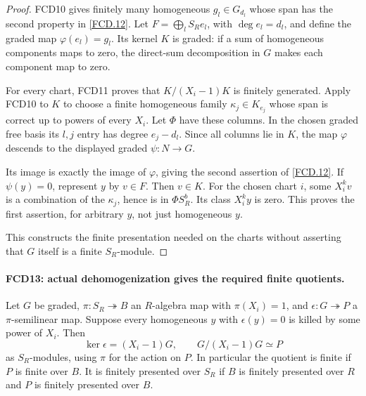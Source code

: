 \documentclass[11pt,a4paper]{article}
\numberwithin{equation}{section}
\theoremstyle{remark}\newtheorem{remark}[theorem]{Remark}
\begin{document}
\begin{proof}
FCD10 gives finitely many homogeneous $g_l\in G_{d_l}$ whose
span has the second property in \eqref{FCD.12}.  Let
$F=\bigoplus_lS_Re_l$, with $\deg e_l=d_l$, and define the
graded map $\varphi(e_l)=g_l$.  Its kernel $K$ is graded:
if a sum of homogeneous components maps to zero, the direct-sum
decomposition in $G$ makes each component map to zero.

For every chart, FCD11 proves that $K/(X_i-1)K$ is finitely
generated.  Apply FCD10 to $K$ to choose a finite homogeneous
family $\kappa_j\in K_{e_j}$ whose span is correct up to powers
of every $X_i$.  Let $\Phi$ have these columns.  In the chosen
graded free basis its $l,j$ entry has degree $e_j-d_l$.
Since all columns lie in $K$, the map $\varphi$ descends to the
displayed graded $\psi:N\to G$.

Its image is exactly the image of $\varphi$, giving the second
assertion of \eqref{FCD.12}.  If $\psi(y)=0$, represent $y$
by $v\in F$.  Then $v\in K$.  For the chosen chart $i$, some
$X_i^kv$ is a combination of the $\kappa_j$, hence is in
$\Phi S_R^b$.  Its class $X_i^ky$ is zero.  This proves the
first assertion, for arbitrary $y$, not just homogeneous $y$.

This constructs the finite presentation needed on the charts without
asserting that $G$ itself is a finite $S_R$-module.
\end{proof}

\paragraph{FCD13: actual dehomogenization gives the required finite quotients.}
\label{claim:FCD13}
Let $G$ be graded, $\pi:S_R\twoheadrightarrow B$ an
$R$-algebra map with $\pi(X_i)=1$, and
$\epsilon:G\twoheadrightarrow P$ a $\pi$-semilinear map.
Suppose every homogeneous $y$ with $\epsilon(y)=0$ is killed
by some power of $X_i$.  Then
\[
 \ker\epsilon=(X_i-1)G,
 \qquad G/(X_i-1)G\simeq P                          \tag{FCD.13}\label{FCD.13}
\]
as $S_R$-modules, using $\pi$ for the action on $P$.
In particular the quotient is finite if $P$ is finite over $B$.
It is finitely presented over $S_R$ if $B$ is finitely presented
over $R$ and $P$ is finitely presented over $B$.
\end{document}
